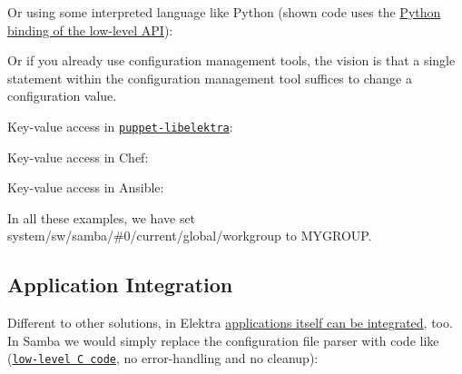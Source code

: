 Or using some interpreted language like Python (shown code uses the \hyperlink{doc_tutorials_python-kdb_md}{Python binding of the low-\/level A\+PI})\+:




Or if you already use configuration management tools, the vision is that a single statement within the configuration management tool suffices to change a configuration value.

Key-\/value access in \href{https://puppet.libelektra.org}{\tt puppet-\/libelektra}\+:




Key-\/value access in Chef\+:




Key-\/value access in Ansible\+:




In all these examples, we have set {\ttfamily system/sw/samba/\#0/current/global/workgroup} to {\ttfamily M\+Y\+G\+R\+O\+UP}.

\subsection*{Application Integration}

Different to other solutions, in Elektra \hyperlink{doc_tutorials_application-integration_md}{applications itself can be integrated}, too. In Samba we would simply replace the configuration file parser with code like (\href{https://doc.libelektra.org/api/current/html/group__key.html}{\tt low-\/level C code}, no error-\/handling and no cleanup)\+:



